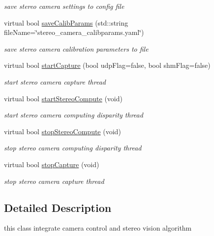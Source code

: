 \begin{DoxyCompactItemize}
\begin{DoxyCompactList}\small\item\em save stereo camera settings to config file \end{DoxyCompactList}\item 
virtual bool \hyperlink{class_stereo_camera_a7611e0d97d57abf36b4fa7dca2a3cfc5}{save\+Calib\+Params} (std\+::string file\+Name=\char`\"{}stereo\+\_\+camera\+\_\+calibparams.\+yaml\char`\"{})
\begin{DoxyCompactList}\small\item\em save stereo camera calibration parameters to file \end{DoxyCompactList}\item 
virtual bool \hyperlink{class_stereo_camera_a4e5146c1d33ab5f4f9a3995b93e3cbc5}{start\+Capture} (bool udp\+Flag=false, bool shm\+Flag=false)
\begin{DoxyCompactList}\small\item\em start stereo camera capture thread \end{DoxyCompactList}\item 
virtual bool \hyperlink{class_stereo_camera_abb6da9140cb988beb753514e7416032b}{start\+Stereo\+Compute} (void)
\begin{DoxyCompactList}\small\item\em start stereo camera computing disparity thread \end{DoxyCompactList}\item 
virtual bool \hyperlink{class_stereo_camera_a3597295e386dfe27474ff0e9567e6d6c}{stop\+Stereo\+Compute} (void)
\begin{DoxyCompactList}\small\item\em stop stereo camera computing disparity thread \end{DoxyCompactList}\item 
virtual bool \hyperlink{class_stereo_camera_a8c9f54bf349fd4dc5a8ba9fd26f22c31}{stop\+Capture} (void)
\begin{DoxyCompactList}\small\item\em stop stereo camera capture thread \end{DoxyCompactList}\end{DoxyCompactItemize}


\subsection{Detailed Description}
this class integrate camera control and stereo vision algorithm 

